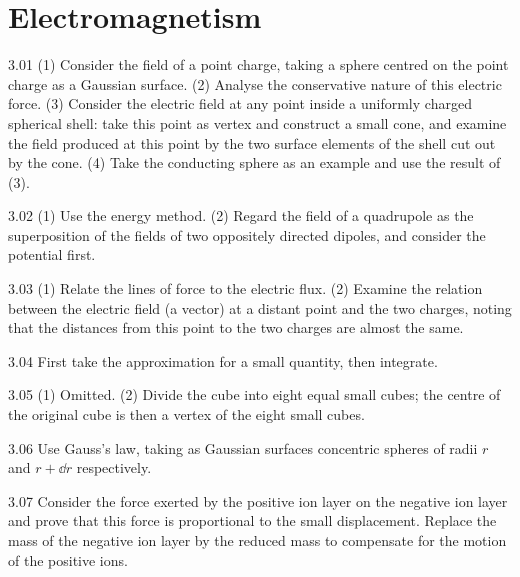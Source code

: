 \section{Electromagnetism}

\begin{hint}{3.01}
(1) Consider the field of a point charge, taking a sphere centred on the point charge as a Gaussian surface. (2) Analyse the conservative nature of this electric force. (3) Consider the electric field at any point inside a uniformly charged spherical shell: take this point as vertex and construct a small cone, and examine the field produced at this point by the two surface elements of the shell cut out by the cone. (4) Take the conducting sphere as an example and use the result of (3).
\end{hint}

\begin{hint}{3.02}
(1) Use the energy method. (2) Regard the field of a quadrupole as the superposition of the fields of two oppositely directed dipoles, and consider the potential first.
\end{hint}

\begin{hint}{3.03}
(1) Relate the lines of force to the electric flux. (2) Examine the relation between the electric field (a vector) at a distant point and the two charges, noting that the distances from this point to the two charges are almost the same.
\end{hint}

\begin{hint}{3.04}
First take the approximation for a small quantity, then integrate.
\end{hint}

\begin{hint}{3.05}
(1) Omitted. (2) Divide the cube into eight equal small cubes; the centre of the original cube is then a vertex of the eight small cubes.
\end{hint}

\begin{hint}{3.06}
Use Gauss's law, taking as Gaussian surfaces concentric spheres of radii $r$ and $r+\dd r$ respectively.
\end{hint}

\begin{hint}{3.07}
Consider the force exerted by the positive ion layer on the negative ion layer and prove that this force is proportional to the small displacement. Replace the mass of the negative ion layer by the reduced mass to compensate for the motion of the positive ions.
\end{hint}

